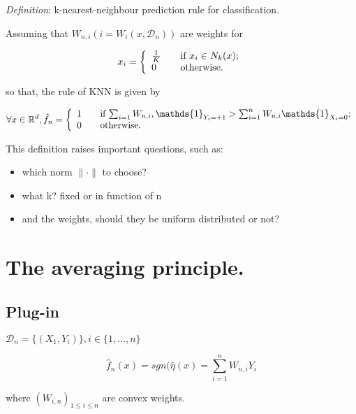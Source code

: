 		\emph{Definition}: k-nearest-neighbour prediction rule for classification.

		Assuming that $W_{n,i}(i=W_i(x,\mathcal{D}_n))$ are weights for 

			\[
			  x_i = \left\{
			  \begin{array}{l l}
			    \frac{1}{K} & \quad \text{if $x_i\in N_k(x)$;}\\
			    0 & \quad \text{otherwise.}\\
			  \end{array} \right.
			\]

		so that, the rule of KNN is given by

			\[
			  \forall x\in\mathbb{R}^d, \hat{f}_n = \left\{
			  \begin{array}{l l}
			    1 & \quad \text{if $\sum_{i=1} W_{n,i}, \mathds{1}_{Y_i=+1}>\sum_{i=1}^{n} W_{n,i}\mathds{1}_{X_i=0}$;}\\
			    0 & \quad \text{otherwise.}\\
			  \end{array} \right.
			\]

		This definition raises important questions, such as:

		\begin{itemize}
			\item which norm $\|\cdot\|$ to choose?
			\item what k? fixed or in function of n
			\item and the weights, should they be uniform distributed or not?
		\end{itemize}


	\section{The averaging principle.}

		\subsection{Plug-in} 
			$\mathcal{D}_n=\{(X_1,Y_i)\}, i\in\{1,\dots,n\}$

			\[
			  \hat{f}_n(x)=sgn(\hat{\eta}(x)=\sum_{i=1}^{n} W_{n,i}Y_i
			\]
			
			where $(W_{i,n})_{1\leq i\leq n}$ are convex weights.
		
